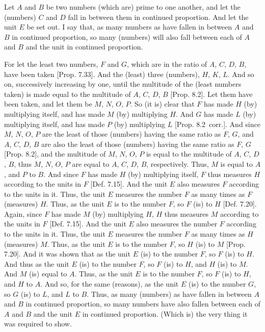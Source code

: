 \begin{Parallel}{}{}
{\epsfysize=2in
\centerline{}

Let $A$ and $B$ be two numbers (which are) prime to one another, and let the
(numbers) $C$ and $D$ fall in  between them in continued proportion. And let the unit $E$ be set out. I say that, as many numbers   as have fallen in between $A$ and $B$ in continued proportion, so many (numbers)  will also
fall between each of $A$ and $B$ and the unit in continued proportion.

For let the least two numbers, $F$ and $G$, which are in the
ratio of $A$, $C$, $D$, $B$, have been taken [Prop. 7.33]. And the (least) three (numbers), $H$, $K$, $L$. And so on, successively increasing by one, until the multitude
of the (least numbers taken) is made  equal to the multitude of $A$, $C$, $D$, $B$
[Prop. 8.2]. Let them have been taken, and let
them be $M$, $N$, $O$, $P$. So (it is) clear that $F$ has made $H$ (by)
multiplying itself, and has made $M$ (by) multiplying $H$. And $G$
has made $L$ (by) multiplying itself, and has made $P$ (by) multiplying $L$
[Prop. 8.2~corr.]. And since $M$, $N$, $O$, $P$
are the least of those (numbers) having the same ratio as $F$, $G$, and
$A$, $C$, $D$, $B$ are also the least of those (numbers) having the
same ratio as $F$, $G$ [Prop. 8.2], and the multitude
of $M$, $N$, $O$, $P$ is equal to the multitude of $A$, $C$, $D$, $B$, thus
$M$, $N$, $O$, $P$ are  equal to  $A$, $C$, $D$, $B$, respectively. 
Thus, $M$ is equal to $A$, and $P$ to $B$. And since $F$ has made
$H$ (by) multiplying itself, $F$ thus measures $H$ according to the
units in $F$ [Def. 7.15].  And the unit $E$ also
measures $F$ according to the units in it. Thus, the unit $E$
measures the number $F$ as many times as $F$ (measures) $H$. Thus,
as the unit $E$ is to the number $F$, so $F$ (is) to $H$ [Def. 7.20]. Again, since $F$ has made $M$ (by)
multiplying $H$, $H$ thus measures $M$ according to the units in $F$
 [Def. 7.15].  And the unit $E$ also measures
 the number $F$ according to the units in it. Thus, the unit $E$ measures
 the number $F$ as many times as $H$ (measures) $M$. Thus,
 as the unit $E$ is to the number $F$, so $H$ (is) to $M$ [Prop. 7.20]. And it was shown
 that as the unit $E$ (is) to the number $F$, so $F$ (is) to $H$. And thus
 as the unit $E$ (is) to the number $F$, so $F$ (is) to $H$, and $H$ (is)
 to $M$. And $M$ (is) equal to $A$. Thus, as the unit $E$ is to the number
 $F$, so $F$ (is) to $H$, and $H$ to $A$. And so, for the same (reasons),
 as the unit $E$ (is) to the number $G$, so $G$ (is) to $L$, and $L$ to
 $B$.  Thus, as many  (numbers)  as have fallen
 in between $A$ and $B$  in continued proportion,  so many numbers  have also fallen between each of $A$ and $B$ and the unit 
 $E$ in continued proportion. (Which is) the very thing it was required to show. }
\end{Parallel}

